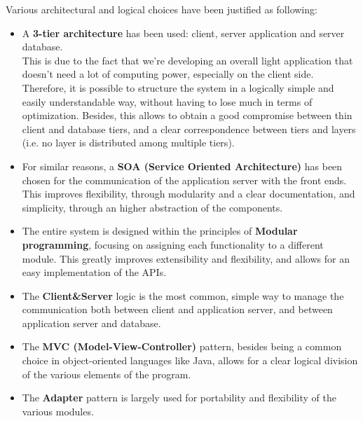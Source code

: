 Various architectural and logical choices have been justified as following:

\begin{itemize}
	
	\item A \textbf{3-tier architecture} has been used: client, server application and server database.\\
	This is due to the fact that we're developing an overall light application that doesn't need a lot of computing power, especially on the client side. Therefore, it is possible to structure the system in a logically simple and easily understandable way, without having to lose much in terms of optimization. Besides, this allows to obtain a good compromise between thin client and database tiers, and a clear correspondence between tiers and layers (i.e. no layer is distributed among multiple tiers).
	
	\item For similar reasons, a \textbf{SOA (Service Oriented Architecture)} has been chosen for the communication of the application server with the front ends. This improves flexibility, through modularity and a clear documentation, and simplicity, through an higher abstraction of the components.
	
	\item The entire system is designed within the principles of \textbf{Modular programming}, focusing on assigning each functionality to a different module. This greatly improves extensibility and flexibility, and allows for an easy implementation of the APIs.
	
	\item The \textbf{Client\&Server} logic is the most common, simple way to manage the communication both between client and application server, and between application server and database.
	
	\item The \textbf{MVC (Model-View-Controller)} pattern, besides being a common choice in object-oriented languages like Java, allows for a clear logical division of the various elements of the program.
	
	\item The \textbf{Adapter} pattern is largely used for portability and flexibility of the various modules.
	
\end{itemize}